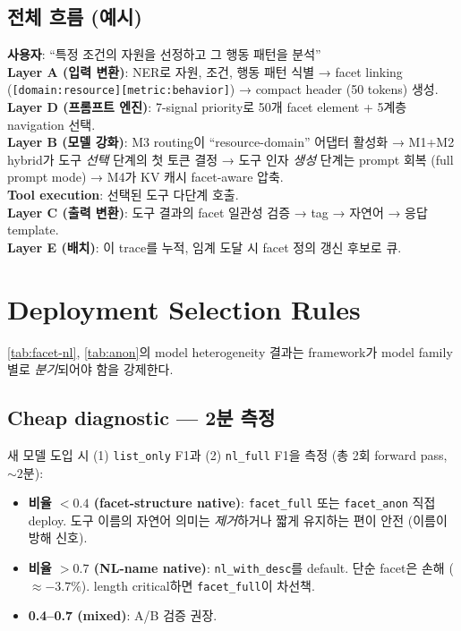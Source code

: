 \documentclass[11pt]{article}
\theoremstyle{definition}
\begin{document}
\subsection{전체 흐름 (예시)}
\label{sec:flow-example}

\begin{tcolorbox}[colback=gray!5!white, colframe=gray!50!black, title=한 turn의 처리 흐름]
\small
\textbf{사용자}: ``특정 조건의 자원을 선정하고 그 행동 패턴을 분석''\\[2pt]
\textbf{Layer A (입력 변환)}: NER로 자원, 조건, 행동 패턴 식별 → facet linking (\texttt{[domain:resource][metric:behavior]}) → compact header (50 tokens) 생성.\\[2pt]
\textbf{Layer D (프롬프트 엔진)}: 7-signal priority로 50개 facet element + 5계층 navigation 선택.\\[2pt]
\textbf{Layer B (모델 강화)}: M3 routing이 ``resource-domain'' 어댑터 활성화 → M1+M2 hybrid가 도구 \emph{선택} 단계의 첫 토큰 결정 → 도구 인자 \emph{생성} 단계는 prompt 회복 (full prompt mode) → M4가 KV 캐시 facet-aware 압축.\\[2pt]
\textbf{Tool execution}: 선택된 도구 다단계 호출.\\[2pt]
\textbf{Layer C (출력 변환)}: 도구 결과의 facet 일관성 검증 → tag → 자연어 → 응답 template.\\[2pt]
\textbf{Layer E (배치)}: 이 trace를 누적, 임계 도달 시 facet 정의 갱신 후보로 큐.
\end{tcolorbox}

\section{Deployment Selection Rules}
\label{sec:deployment-rule}

\cref{tab:facet-nl}, \cref{tab:anon}의 model heterogeneity 결과는 framework가 model family별로 \emph{분기}되어야 함을 강제한다.

\subsection{Cheap diagnostic — 2분 측정}

새 모델 도입 시 (1) \texttt{list\_only} F1과 (2) \texttt{nl\_full} F1을 측정 (총 2회 forward pass, $\sim 2$분):
\begin{itemize}[leftmargin=*]
\item \textbf{비율 $< 0.4$ (facet-structure native)}: \texttt{facet\_full} 또는 \texttt{facet\_anon} 직접 deploy. 도구 이름의 자연어 의미는 \emph{제거}하거나 짧게 유지하는 편이 안전 (이름이 방해 신호).
\item \textbf{비율 $> 0.7$ (NL-name native)}: \texttt{nl\_with\_desc}를 default. 단순 facet은 손해 ($\approx -3.7\%$). length critical하면 \texttt{facet\_full}이 차선책.
\item \textbf{0.4--0.7 (mixed)}: A/B 검증 권장.
\end{itemize}
\end{document}
